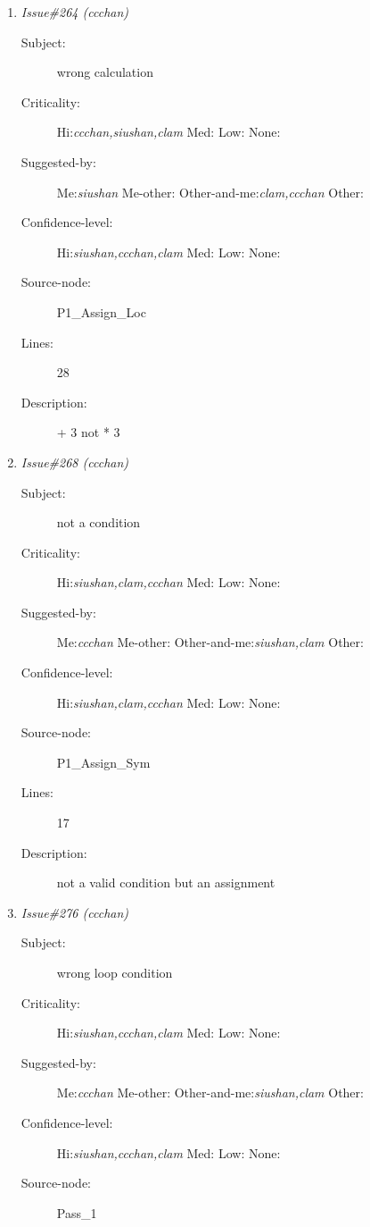 \begin{enumerate}
\begin{description}
\item [Lines:] 23

\item [Description:] j=i+1
\end{description}
\item {\it Issue\#264 (ccchan)}
\begin{description}
\item [Subject:] wrong calculation
\item [Criticality:] Hi:{\it ccchan,siushan,clam} Med:{\it } Low:{\it } None:{\it }
\item [Suggested-by:] Me:{\it siushan} Me-other:{\it } Other-and-me:{\it clam,ccchan} Other:{\it }
\item [Confidence-level:] Hi:{\it siushan,ccchan,clam} Med:{\it } Low:{\it } None:{\it }
\item [Source-node:] P1\_Assign\_Loc

\item [Lines:] 28

\item [Description:] + 3 not * 3
\end{description}
\item {\it Issue\#268 (ccchan)}
\begin{description}
\item [Subject:] not a condition
\item [Criticality:] Hi:{\it siushan,clam,ccchan} Med:{\it } Low:{\it } None:{\it }
\item [Suggested-by:] Me:{\it ccchan} Me-other:{\it } Other-and-me:{\it siushan,clam} Other:{\it }
\item [Confidence-level:] Hi:{\it siushan,clam,ccchan} Med:{\it } Low:{\it } None:{\it }
\item [Source-node:] P1\_Assign\_Sym

\item [Lines:] 17

\item [Description:] not a valid condition but an assignment
\end{description}
\item {\it Issue\#276 (ccchan)}
\begin{description}
\item [Subject:] wrong loop condition
\item [Criticality:] Hi:{\it siushan,ccchan,clam} Med:{\it } Low:{\it } None:{\it }
\item [Suggested-by:] Me:{\it ccchan} Me-other:{\it } Other-and-me:{\it siushan,clam} Other:{\it }
\item [Confidence-level:] Hi:{\it siushan,ccchan,clam} Med:{\it } Low:{\it } None:{\it }
\item [Source-node:] Pass\_1


\end{description}
\end{enumerate}
